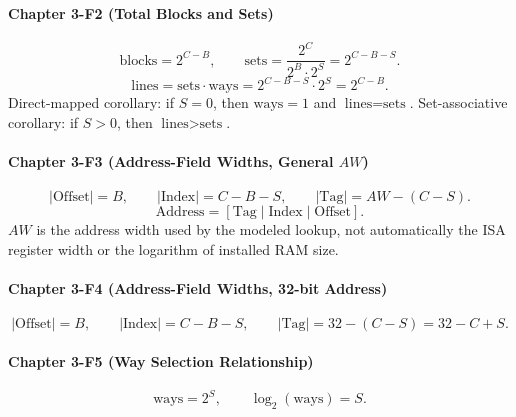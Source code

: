 \paragraph{Chapter 3-F2 (Total Blocks and Sets)}\label{par:auto-055}
\begin{equation}\label{eq:auto-066}
    \text{blocks}=2^{C-B},\qquad
    \text{sets}=\frac{2^C}{2^B\cdot 2^S}=2^{C-B-S}.
\end{equation}
\begin{equation}\label{eq:auto-087}
    \text{lines}=\text{sets}\cdot\text{ways}=2^{C-B-S}\cdot 2^S=2^{C-B}.
\end{equation}
Direct-mapped corollary: if $S=0$, then $\text{ways}=1$ and $\text{lines}=\text{sets}$.
Set-associative corollary: if $S>0$, then $\text{lines}>\text{sets}$.

\paragraph{Chapter 3-F3 (Address-Field Widths, General $AW$)}\label{par:auto-056}
\begin{equation}\label{eq:auto-067}
    |\text{Offset}|=B,\qquad
    |\text{Index}|=C-B-S,\qquad
    |\text{Tag}|=AW-(C-S).
\end{equation}
\begin{equation}\label{eq:auto-068}
    \text{Address}=[\text{Tag}\mid\text{Index}\mid\text{Offset}].
\end{equation}
$AW$ is the address width used by the modeled lookup, not automatically the ISA register width or the logarithm of installed RAM size.

\paragraph{Chapter 3-F4 (Address-Field Widths, 32-bit Address)}\label{par:auto-057}
\begin{equation}\label{eq:auto-069}
    |\text{Offset}|=B,\qquad
    |\text{Index}|=C-B-S,\qquad
    |\text{Tag}|=32-(C-S)=32-C+S.
\end{equation}

\paragraph{Chapter 3-F5 (Way Selection Relationship)}\label{par:auto-058}
\begin{equation}\label{eq:auto-070}
    \text{ways}=2^S,\qquad
    \log_2(\text{ways})=S.
\end{equation}

